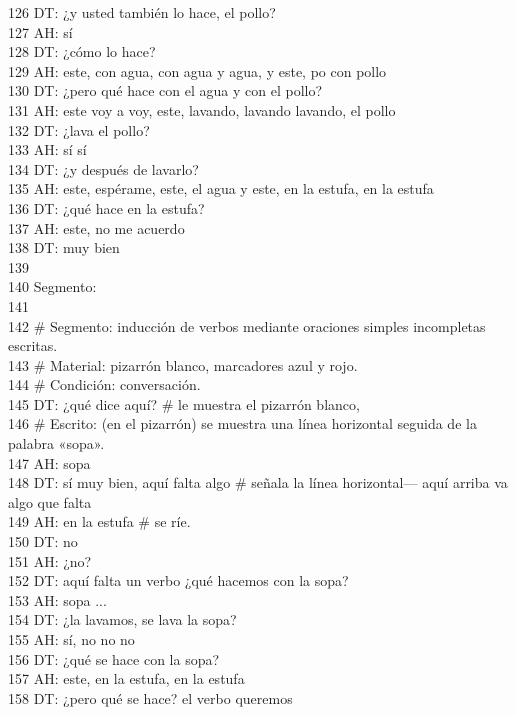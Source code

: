 126 DT: ¿y usted también lo hace, el pollo?\\
127 AH: sí\\
128 DT: ¿cómo lo hace?\\
129 AH: este, con agua, con agua y agua, y este, po con pollo\\
130 DT: ¿pero qué hace con el agua y con el pollo?\\
131 AH: este voy a voy, este, lavando, lavando lavando, el pollo\\
132 DT: ¿lava el pollo?\\
133 AH: sí sí\\
134 DT: ¿y después de lavarlo?\\
135 AH: este, espérame, este, el agua y este, en la estufa, en la estufa\\
136 DT: ¿qué hace en la estufa?\\
137 AH: este, no me acuerdo\\
138 DT: muy bien\\
139 \\
140 Segmento: \\
141 \\
142 \# Segmento: inducción de verbos mediante oraciones simples incompletas escritas.\\
143 \# Material: pizarrón blanco, marcadores azul y rojo.\\
144 \# Condición: conversación.\\
145 DT: ¿qué dice aquí? \# le muestra el pizarrón blanco,\\
146 \# Escrito: (en el pizarrón) se muestra una línea horizontal seguida de la palabra «sopa».\\
147 AH: sopa\\
148 DT: sí muy bien, aquí falta algo \# señala la línea horizontal--- aquí arriba va algo que falta\\
149 AH: en la estufa \# se ríe.\\
150 DT: no\\
151 AH: ¿no?\\
152 DT: aquí falta un verbo ¿qué hacemos con la sopa?\\
153 AH: sopa ...\\
154 DT: ¿la lavamos, se lava la sopa?\\
155 AH: sí, no no no\\
156 DT: ¿qué se hace con la sopa?\\
157 AH: este, en la estufa, en la estufa\\
158 DT: ¿pero qué se hace? el verbo queremos\\
